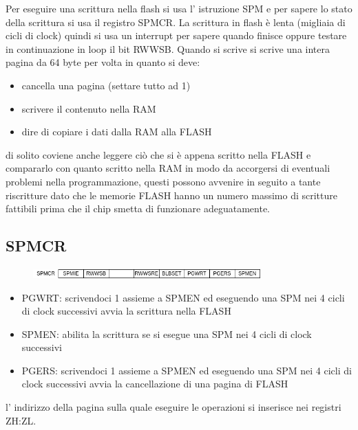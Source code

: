 Per eseguire una scrittura nella flash si usa l' istruzione SPM e per sapere lo stato della scrittura si usa il registro SPMCR.
La scrittura in flash è lenta (migliaia di cicli di clock) quindi si usa un interrupt per sapere quando finisce oppure testare in continuazione in loop il bit RWWSB.
Quando si scrive si scrive una intera pagina da 64 byte per volta in quanto si deve:
\begin{itemize}
    \item cancella una pagina (settare tutto ad 1)
    \item scrivere il contenuto nella RAM
    \item dire di copiare i dati dalla RAM alla FLASH
\end{itemize}
di solito coviene anche leggere ciò che si è appena scritto nella FLASH e compararlo con quanto scritto nella RAM in modo da accorgersi di eventuali problemi nella programmazione, questi possono avvenire in seguito a tante riscritture dato che le memorie FLASH hanno un numero massimo di scritture fattibili prima che il chip smetta di funzionare adeguatamente.

\subsection{SPMCR}
\begin{figure}[H]
    \centering
    \includegraphics[width=330px]{images/27_Bootloader/SPMCR.png}
\end{figure}
\begin{itemize}
    \item PGWRT: scrivendoci 1 assieme a SPMEN ed eseguendo una SPM nei 4 cicli di clock successivi avvia la scrittura nella FLASH

    \item SPMEN: abilita la scrittura se si esegue una SPM nei 4 cicli di clock successivi

    \item PGERS: scrivendoci 1 assieme a SPMEN ed eseguendo una SPM nei 4 cicli di clock successivi avvia la cancellazione di una pagina di FLASH
\end{itemize}
l' indirizzo della pagina sulla quale eseguire le operazioni si inserisce nei registri ZH:ZL.


